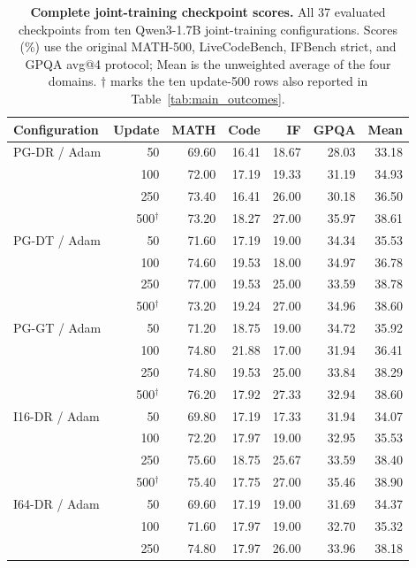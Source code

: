 \begin{table}[p]
\centering
\caption{\textbf{Complete joint-training checkpoint scores.} All 37 evaluated checkpoints from ten Qwen3-1.7B joint-training configurations. Scores (\%) use the original MATH-500, LiveCodeBench, IFBench strict, and GPQA avg@4 protocol; Mean is the unweighted average of the four domains. $\dagger$ marks the ten update-500 rows also reported in Table~\ref{tab:main_outcomes}.}
\label{tab:qwen_all_checkpoints}
\begingroup
\footnotesize
\setlength{\tabcolsep}{5pt}
\renewcommand{\arraystretch}{1.02}
\begin{tabular}{lrrrrrr}
\toprule
Configuration & Update & MATH & Code & IF & GPQA & Mean \\
\midrule
PG-DR / Adam & 50 & 69.60 & 16.41 & 18.67 & 28.03 & 33.18 \\
 & 100 & 72.00 & 17.19 & 19.33 & 31.19 & 34.93 \\
 & 250 & 73.40 & 16.41 & 26.00 & 30.18 & 36.50 \\
 & 500$^{\dagger}$ & 73.20 & 18.27 & 27.00 & 35.97 & 38.61 \\
\addlinespace[2pt]
PG-DT / Adam & 50 & 71.60 & 17.19 & 19.00 & 34.34 & 35.53 \\
 & 100 & 74.60 & 19.53 & 18.00 & 34.97 & 36.78 \\
 & 250 & 77.00 & 19.53 & 25.00 & 33.59 & 38.78 \\
 & 500$^{\dagger}$ & 73.20 & 19.24 & 27.00 & 34.96 & 38.60 \\
\addlinespace[2pt]
PG-GT / Adam & 50 & 71.20 & 18.75 & 19.00 & 34.72 & 35.92 \\
 & 100 & 74.80 & 21.88 & 17.00 & 31.94 & 36.41 \\
 & 250 & 74.80 & 19.53 & 25.00 & 33.84 & 38.29 \\
 & 500$^{\dagger}$ & 76.20 & 17.92 & 27.33 & 32.94 & 38.60 \\
\addlinespace[2pt]
I16-DR / Adam & 50 & 69.80 & 17.19 & 17.33 & 31.94 & 34.07 \\
 & 100 & 72.20 & 17.97 & 19.00 & 32.95 & 35.53 \\
 & 250 & 75.60 & 18.75 & 25.67 & 33.59 & 38.40 \\
 & 500$^{\dagger}$ & 75.40 & 17.75 & 27.00 & 35.46 & 38.90 \\
\addlinespace[2pt]
I64-DR / Adam & 50 & 69.60 & 17.19 & 19.00 & 31.69 & 34.37 \\
 & 100 & 71.60 & 17.97 & 19.00 & 32.70 & 35.32 \\
 & 250 & 74.80 & 17.97 & 26.00 & 33.96 & 38.18 \\

\end{tabular}
\end{table}
